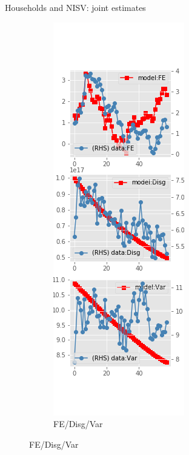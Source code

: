 \documentclass{beamer}
\begin{document}
\begin{frame}{Households and NISV: joint estimates}
\begin{figure}[ht]
\begin{subfigure}[b]{0.2\textwidth}
		\end{subfigure}
		\hfill
		\begin{subfigure}[b]{0.2\textwidth}
			\caption{FE/Disg/Var}
			\includegraphics[width=\textwidth, height = 0.8\textheight]{figuresDraft/sce_ni_est_sv_joint_diag3.png}
		\end{subfigure}
	\end{figure}
\end{frame}
\end{document}
